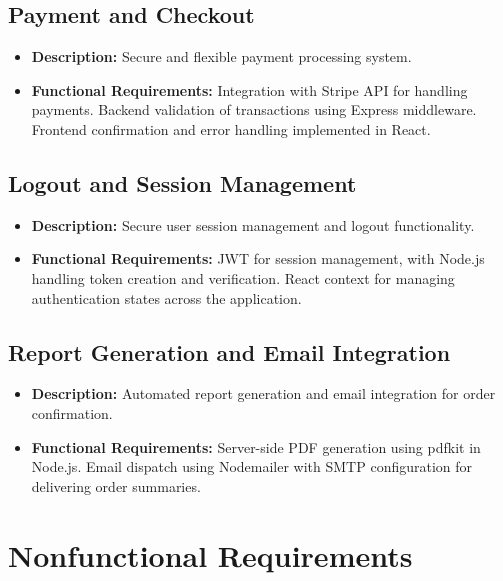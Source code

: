 \documentclass{article}
\begin{document}
\subsection{Payment and Checkout}
\begin{itemize}
    \item \textbf{Description:} Secure and flexible payment processing system.
    \item \textbf{Functional Requirements:} Integration with Stripe API for handling payments. Backend validation of transactions using Express middleware. Frontend confirmation and error handling implemented in React.
\end{itemize}

\subsection{Logout and Session Management}
\begin{itemize}
    \item \textbf{Description:} Secure user session management and logout functionality.
    \item \textbf{Functional Requirements:} JWT for session management, with Node.js handling token creation and verification. React context for managing authentication states across the application.
\end{itemize}

\subsection{Report Generation and Email Integration}
\begin{itemize}
    \item \textbf{Description:} Automated report generation and email integration for order confirmation.
    \item \textbf{Functional Requirements:} Server-side PDF generation using pdfkit in Node.js. Email dispatch using Nodemailer with SMTP configuration for delivering order summaries.
\end{itemize}



\newpage
\newpage
\section{Nonfunctional Requirements}
\end{document}
